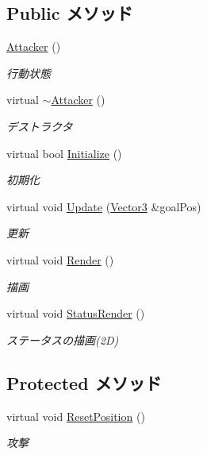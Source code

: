 \subsection*{Public メソッド}
\begin{DoxyCompactItemize}
\item 
\hyperlink{class_attacker_a84fe68147e28f2e98d8eeecee9d3734c}{Attacker} ()
\begin{DoxyCompactList}\small\item\em 行動状態 \end{DoxyCompactList}\item 
virtual \hyperlink{class_attacker_a1725eca90fd1453089946540dc908a2e}{$\sim$\-Attacker} ()
\begin{DoxyCompactList}\small\item\em デストラクタ \end{DoxyCompactList}\item 
virtual bool \hyperlink{class_attacker_a21832a3a6f5572e15793983c4a084256}{Initialize} ()
\begin{DoxyCompactList}\small\item\em 初期化 \end{DoxyCompactList}\item 
virtual void \hyperlink{class_attacker_a1033c8ed7d3b31300ff2ea0619f5f4dd}{Update} (\hyperlink{struct_vector3}{Vector3} \&goal\-Pos)
\begin{DoxyCompactList}\small\item\em 更新 \end{DoxyCompactList}\item 
virtual void \hyperlink{class_attacker_af276df8f646d1242e6b8b3259a2fb9cc}{Render} ()
\begin{DoxyCompactList}\small\item\em 描画 \end{DoxyCompactList}\item 
virtual void \hyperlink{class_attacker_a69f841c2bd1a9c6ca1780bed050d0ab8}{Status\-Render} ()
\begin{DoxyCompactList}\small\item\em ステータスの描画(2\-D) \end{DoxyCompactList}\end{DoxyCompactItemize}
\subsection*{Protected メソッド}
\begin{DoxyCompactItemize}
\item 
virtual void \hyperlink{class_attacker_aa5a8c782e4ba8ab96c7cf1976413ba42}{Reset\-Position} ()
\begin{DoxyCompactList}\small\item\em 攻撃 \end{DoxyCompactList}\end{DoxyCompactItemize}
